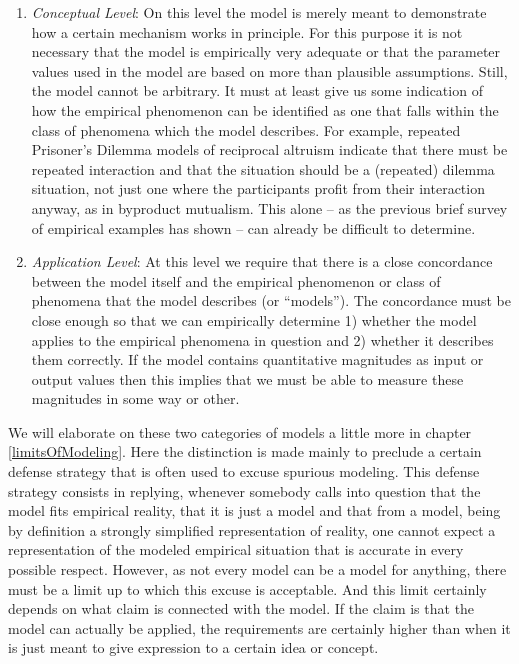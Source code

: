\begin{enumerate}

\item {\em Conceptual Level}: On this level the model is merely meant to
  demonstrate how a certain mechanism works in principle. For this purpose it
  is not necessary that the model is empirically very adequate or that the
  parameter values used in the model are based on more than plausible
  assumptions. Still, the model cannot be arbitrary. It must at least give us
  some indication of how the empirical phenomenon can be identified as one
  that falls within the class of phenomena which the model describes. For
example, repeated Prisoner's Dilemma models of reciprocal altruism indicate
that there must be repeated interaction and that the situation should be a
  (repeated) dilemma situation, not just one where the participants profit
  from their interaction anyway, as in byproduct mutualism. This alone -- as
  the previous brief survey of empirical examples has shown -- can already
  be difficult to determine.

\item {\em Application Level}: At this level we require that there is a close
  concordance between the model itself and the empirical phenomenon or class
  of phenomena that the model describes (or ``models''). The concordance must
  be close enough so that we can empirically determine 1) whether the model
  applies to the empirical phenomena in question and 2) whether it describes
  them correctly.  If the model contains quantitative magnitudes as input or
  output values then this implies that we must be able to measure these
  magnitudes in some way or other.

\end{enumerate}

We will elaborate on these two categories of models a little more in chapter
\ref{limitsOfModeling}. Here the distinction is made mainly to preclude a
certain defense strategy that is often used to excuse spurious modeling. This
defense strategy consists in replying, whenever somebody calls into question
that the model fits empirical reality, that it is just a model and that from a
model, being by definition a strongly simplified representation of reality, one
cannot expect a representation of the modeled empirical situation that is
accurate in every possible respect.  However, as not every model can be a
model for anything, there must be a limit up to which this excuse is
acceptable. And this limit certainly depends on what claim is connected with
the model. If the claim is that the model can actually be applied, the
requirements are certainly higher than when it is just meant to give
expression to a certain idea or concept.

